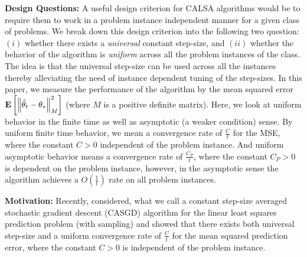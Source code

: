 \textbf{Design Questions:} A useful design criterion for CALSA algorithms would be to require them to work in a problem instance independent manner for a given class of  problems. We break down this design criterion into the following two question: $(i)$ whether there exists a \emph{universal} constant step-size, and $(ii)$ whether the behavior of the algorithm is \emph{uniform} across all the problem instances of the class. The idea is that the universal step-size can be used across all the instances thereby alleviating the need of instance dependent tuning of the step-sizes. In this paper, we measure the performance of the algorithm by the mean squared error $\mathbf{E}\left[\left\| \hat{\theta}_t-\theta_*\right\|^2_M\right]$ (where $M$ is a positive definite matrix). Here, we look at uniform behavior in the finite time as well as asymptotic (a weaker condition) sense. By uniform finite time behavior, we mean a convergence rate of $\frac{C}{t}$ for the MSE, where the constant $C>0$ independent of the problem instance. And uniform asymptotic behavior means a convergence rate of $\frac{C_P}{t}$, where the constant $C_P>0$ is dependent on the problem instance, however, in the asymptotic sense the algorithm achieves a $O(\frac{1}{t})$ rate on all problem instances.

\textbf{Motivation:} Recently, \citet{bach} considered, what we call a constant step-size averaged stochastic gradient descent (CASGD) 
 algorithm for the linear least squares prediction problem (with \iid sampling) and showed that there exists both universal step-size and a uniform convergence rate of $\frac{C}{t}$ for the mean squared prediction error,
 where the constant $C>0$ is independent of the problem instance. 


